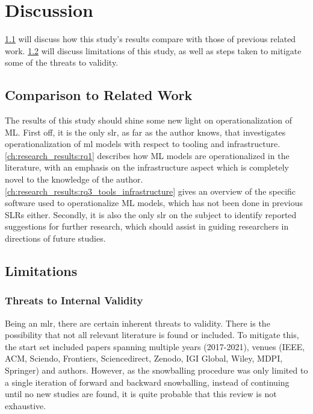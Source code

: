 \chapter{Discussion}
\label{ch:discussion}
\cref{ch:discussion:comparison_to_related_work} will discuss how this study's results compare with those of previous related work.
\cref{ch:discussion:limitations} will discuss limitations of this study, as well as steps taken to mitigate some of the threats to validity.

\section{Comparison to Related Work}
\label{ch:discussion:comparison_to_related_work}
The results of this study should shine some new light on operationalization of ML.
First off, it is the only \acrshort{slr}, as far as the author knows, that investigates operationalization of \acrshort{ml} models with respect to tooling and infrastructure.
\cref{ch:research_results:rq1} describes how ML models are operationalized in the literature, with an emphasis on the infrastructure aspect which is completely novel to the knowledge of the author.
\cref{ch:research_results:rq3_tools_infrastructure} gives an overview of the specific software used to operationalize ML models, which has not been done in previous SLRs either.
Secondly, it is also the only \acrshort{slr} on the subject to identify reported suggestions for further research, which should assist in guiding researchers in directions of future studies.

\section{Limitations}
\label{ch:discussion:limitations}
\subsection{Threats to Internal Validity}
Being an \acrshort{mlr}, there are certain inherent threats to validity.
There is the possibility that not all relevant literature is found or included.
To mitigate this, the start set included papers spanning multiple years (2017-2021), venues (IEEE, ACM, Sciendo, Frontiers, Sciencedirect, Zenodo, IGI Global, Wiley, MDPI, Springer) and authors.
However, as the snowballing procedure was only limited to a single iteration of forward and backward snowballing, instead of continuing until no new studies are found, it is quite probable that this review is not exhaustive.

